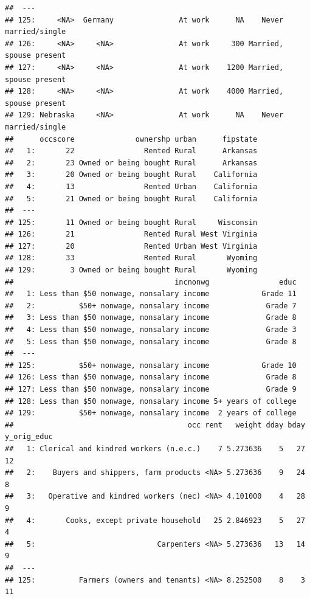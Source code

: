 \documentclass[]{book}
\begin{document}
\begin{verbatim}
##  ---                                                                        
## 125:     <NA>  Germany               At work      NA    Never married/single
## 126:     <NA>     <NA>               At work     300 Married, spouse present
## 127:     <NA>     <NA>               At work    1200 Married, spouse present
## 128:     <NA>     <NA>               At work    4000 Married, spouse present
## 129: Nebraska     <NA>               At work      NA    Never married/single
##      occscore              ownershp urban      fipstate
##   1:       22                Rented Rural      Arkansas
##   2:       23 Owned or being bought Rural      Arkansas
##   3:       20 Owned or being bought Rural    California
##   4:       13                Rented Urban    California
##   5:       21 Owned or being bought Rural    California
##  ---                                                   
## 125:       11 Owned or being bought Rural     Wisconsin
## 126:       21                Rented Rural West Virginia
## 127:       20                Rented Urban West Virginia
## 128:       33                Rented Rural       Wyoming
## 129:        3 Owned or being bought Rural       Wyoming
##                                     incnonwg                educ
##   1: Less than $50 nonwage, nonsalary income            Grade 11
##   2:          $50+ nonwage, nonsalary income             Grade 7
##   3: Less than $50 nonwage, nonsalary income             Grade 8
##   4: Less than $50 nonwage, nonsalary income             Grade 3
##   5: Less than $50 nonwage, nonsalary income             Grade 8
##  ---                                                            
## 125:          $50+ nonwage, nonsalary income            Grade 10
## 126: Less than $50 nonwage, nonsalary income             Grade 8
## 127: Less than $50 nonwage, nonsalary income             Grade 9
## 128: Less than $50 nonwage, nonsalary income 5+ years of college
## 129:          $50+ nonwage, nonsalary income  2 years of college
##                                        occ rent   weight dday bday y_orig_educ
##   1: Clerical and kindred workers (n.e.c.)    7 5.273636    5   27          12
##   2:    Buyers and shippers, farm products <NA> 5.273636    9   24           8
##   3:   Operative and kindred workers (nec) <NA> 4.101000    4   28           9
##   4:       Cooks, except private household   25 2.846923    5   27           4
##   5:                            Carpenters <NA> 5.273636   13   14           9
##  ---                                                                          
## 125:          Farmers (owners and tenants) <NA> 8.252500    8    3          11

\end{verbatim}
\end{document}

